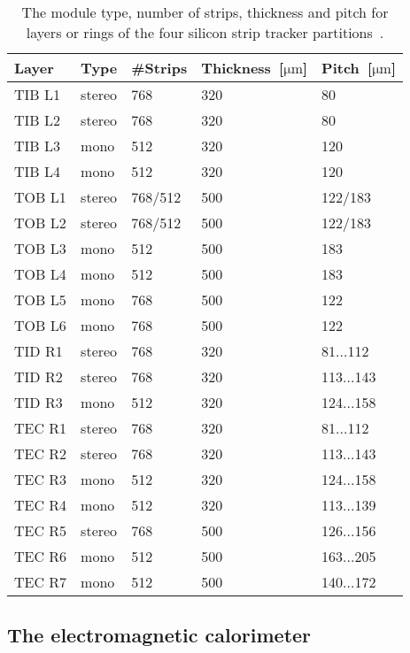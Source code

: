 \begin{table}[h]
\begin{center}
\begin{tabular}{|l|l|l|l|l|}
\hline
Layer & Type  & #Strips & Thickness~[$\mathrm{\mu m}$] & Pitch~[$\mathrm{\mu m}$]  \\
\hline
\hline
TIB L1 & stereo & 768 & 320 & 80  \\
TIB L2 & stereo & 768 & 320 & 80  \\
TIB L3 & mono & 512 & 320 & 120  \\
TIB L4 & mono & 512 & 320 & 120 \\
\hline
TOB L1 & stereo & 768/512 & 500 & 122/183 \\
TOB L2 & stereo & 768/512 & 500 & 122/183 \\
TOB L3 & mono & 512 & 500 & 183 \\
TOB L4 & mono & 512 & 500 & 183 \\
TOB L5 & mono & 768 & 500 & 122 \\
TOB L6 & mono & 768 & 500 & 122 \\
\hline
TID R1 & stereo & 768 & 320 & 81...112  \\
TID R2 & stereo & 768 & 320 & 113...143  \\
TID R3 & mono & 512 & 320 & 124...158  \\
\hline
TEC R1 & stereo & 768 & 320 & 81...112  \\
TEC R2 & stereo & 768 & 320 & 113...143  \\
TEC R3 & mono & 512 & 320 & 124...158  \\
TEC R4 & mono & 512 & 320 & 113...139  \\
TEC R5 & stereo & 768 & 500 & 126...156  \\
TEC R6 & mono & 512 & 500 & 163...205  \\
TEC R7 & mono & 512 & 500 & 140...172  \\
\hline
\end{tabular}
\caption[Table caption text]{The module type, number of strips, thickness and pitch for layers or rings of the four silicon strip tracker partitions~\cite{website:hephyPage}. }
\label{tab:trackerGeometries}
\end{center}
\end{table}

\subsection{The electromagnetic calorimeter}


